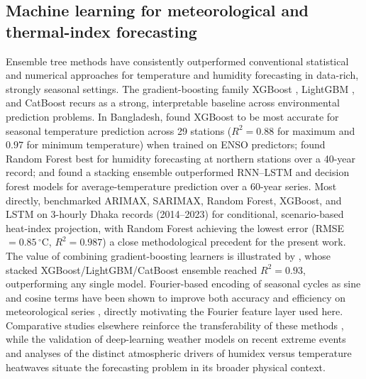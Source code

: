 \documentclass[review,11pt]{elsarticle}
\newcommand{\degC}{\ensuremath{^{\circ}\mathrm{C}}}
\begin{document}
\subsection{Machine learning for meteorological and thermal-index forecasting}
Ensemble tree methods have consistently outperformed conventional statistical and
numerical approaches for temperature and humidity forecasting in data-rich,
strongly seasonal settings. The gradient-boosting family XGBoost
\citep{chen2016xgboost}, LightGBM \citep{ke2017lightgbm}, and CatBoost
\citep{prokhorenkova2018catboost} recurs as a strong, interpretable baseline
across environmental prediction problems. In Bangladesh, \citet{islam2026enso}
found XGBoost to be most accurate for seasonal temperature prediction across 29 stations
($R^{2}=0.88$ for maximum and $0.97$ for minimum temperature) when trained on ENSO
predictors; \citet{akter2025} found Random Forest best for humidity forecasting at
northern stations over a 40-year record; and \citet{rahman2024rnlstm} found a
stacking ensemble outperformed RNN--LSTM and decision forest models for
average-temperature prediction over a 60-year series. Most directly,
\citet{mollah2026mlheatindex} benchmarked ARIMAX, SARIMAX, Random Forest, XGBoost,
and LSTM on 3-hourly Dhaka records (2014--2023) for conditional, scenario-based
heat-index projection, with Random Forest achieving the lowest error
(RMSE~$=0.85\,\degC$, $R^{2}=0.987$) a close methodological precedent for the
present work. The value of combining gradient-boosting learners is illustrated by
\citet{kim2023toxins}, whose stacked XGBoost/LightGBM/CatBoost ensemble reached
$R^{2}=0.93$, outperforming any single model. Fourier-based encoding of seasonal
cycles as sine and cosine terms have been shown to improve both accuracy and
efficiency on meteorological series \citep{galansales2024}, directly motivating the
Fourier feature layer used here. Comparative studies elsewhere reinforce the
transferability of these methods \citep{hanoon2021ml,abdelsattar2025ml}, while the
validation of deep-learning weather models on recent extreme events
\citep{pasche2025validating} and analyses of the distinct atmospheric drivers of
humidex versus temperature heatwaves \citep{jeong2025humidex} situate the
forecasting problem in its broader physical context.
\end{document}
